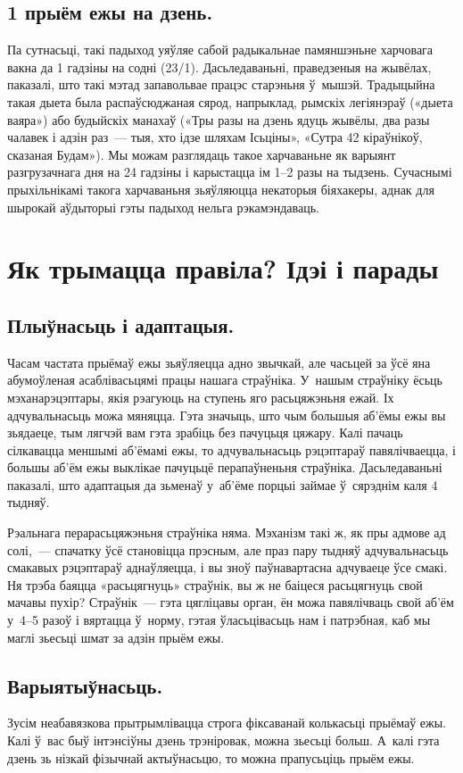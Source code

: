 \subsection{1 прыём ежы на дзень.}
Па сутнасьці, такі падыход уяўляе сабой радыкальнае памяншэньне харчовага вакна да 1 гадзіны на содні (23/1). Дасьледаваньні, праведзеныя на жывёлах, паказалі, што такі мэтад запавольвае працэс старэньня ў~мышэй. Традыцыйна такая дыета была распаўсюджаная сярод, напрыклад, рымскіх легіянэраў («дыета ваяра») або будыйскіх манахаў («Тры разы на дзень ядуць жывёлы, два разы чалавек і адзін раз~--- тыя, хто ідзе шляхам Ісьціны», «Сутра 42 кіраўнікоў, сказаная Будам»). Мы можам разглядаць такое харчаваньне як варыянт разгрузачнага дня на 24 гадзіны і карыстацца ім 1--2 разы на тыдзень. Сучаснымі прыхільнікамі такога харчаваньня зьяўляюцца некаторыя біяхакеры, аднак для шырокай аўдыторыі гэты падыход нельга рэкамэндаваць.

\section{Як трымацца правіла? Ідэі і парады}

\subsection{Плыўнасьць і адаптацыя.}
Часам частата прыёмаў ежы зьяўляецца адно звычкай, але часьцей за ўсё яна абумоўленая асаблівасьцямі працы нашага страўніка. У~нашым страўніку ёсьць мэханарэцэптары, якія рэагуюць на ступень яго расьцяжэньня ежай. Іх адчувальнасьць можа мяняцца. Гэта значыць, што чым большыя аб'ёмы ежы вы зьядаеце, тым лягчэй вам гэта зрабіць без пачуцьця цяжару. Калі пачаць сілкавацца меншымі аб'ёмамі ежы, то адчувальнасьць рэцэптараў павялічваецца, і большы аб'ём ежы выклікае пачуцьцё перапаўненьня страўніка. Дасьледаваньні паказалі, што адаптацыя да зьменаў у~аб'ёме порцыі займае ў~сярэднім каля 4 тыдняў.

Рэальнага перарасьцяжэньня страўніка няма. Мэханізм такі ж, як пры адмове ад солі,~--- спачатку ўсё становіцца прэсным, але праз пару тыдняў адчувальнасьць смакавых рэцэптараў аднаўляецца, і вы зноў паўнавартасна адчуваеце ўсе смакі. Ня трэба баяцца «расьцягнуць» страўнік, вы ж не баіцеся расьцягнуць свой мачавы пухір? Страўнік~--- гэта цягліцавы орган, ён можа павялічваць свой аб'ём у~4--5 разоў і вяртацца ў~норму, гэтая ўласьцівасьць нам і патрэбная, каб мы маглі зьесьці шмат за адзін прыём ежы.

\subsection{Варыятыўнасьць.}
Зусім неабавязкова прытрымлівацца строга фіксаванай колькасьці прыёмаў ежы. Калі ў~вас быў інтэнсіўны дзень трэніровак, можна зьесьці больш. А~калі гэта дзень зь нізкай фізычнай актыўнасьцю, то можна прапусьціць прыём ежы.

